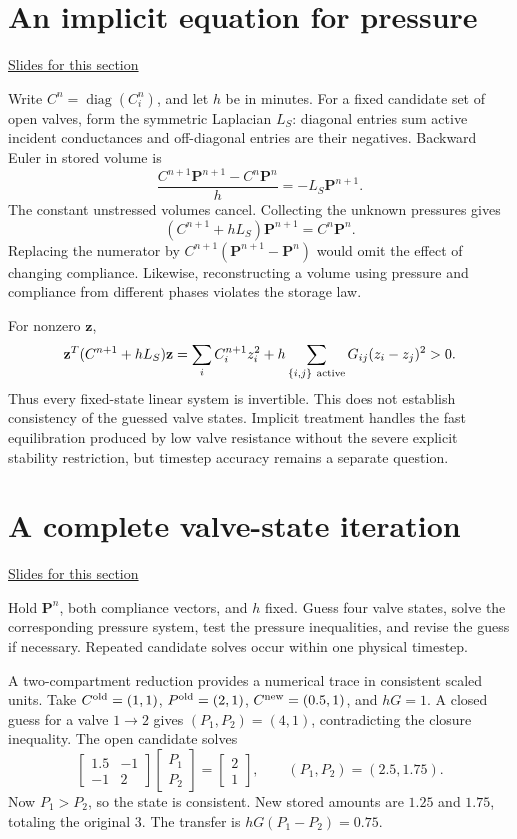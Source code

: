 \documentclass[11pt,letterpaper]{article}
\theoremstyle{definition}\newtheorem{definition}{Definition}\newtheorem{example}{Example}
\numberwithin{equation}{section}
\begin{document}
\section{An implicit equation for pressure}
\hypertarget{note-an-implicit-equation-for-pressure}{}\label{note:an-implicit-equation-for-pressure}
{\small \href{slides.html\#frame=backward-difference-of-stored-volume\&step=1}{Slides for this section}}\par
Write $C^n=\operatorname{diag}(C_i^n)$, and let $h$ be in minutes. For a fixed candidate set of open valves, form the symmetric Laplacian $L_S$: diagonal entries sum active incident conductances and off-diagonal entries are their negatives. Backward Euler in stored volume is
\[
\frac{C^{n+1}\mathbf P^{n+1}-C^n\mathbf P^n}{h}=-L_S\mathbf P^{n+1}.
\]
The constant unstressed volumes cancel. Collecting the unknown pressures gives
\[
\boxed{(C^{n+1}+hL_S)\mathbf P^{n+1}=C^n\mathbf P^n.}
\]
Replacing the numerator by $C^{n+1}(\mathbf P^{n+1}-\mathbf P^n)$ would omit the effect of changing compliance. Likewise, reconstructing a volume using pressure and compliance from different phases violates the storage law.

For nonzero $\mathbf z$,
\[
\mathbf z^T(C^{n+1}+hL_S)\mathbf z=\sum_i C_i^{n+1}z_i^2+h\sum_{\{i,j\}\ {\rm active}}G_{ij}(z_i-z_j)^2>0.
\]
Thus every fixed-state linear system is invertible. This does not establish consistency of the guessed valve states. Implicit treatment handles the fast equilibration produced by low valve resistance without the severe explicit stability restriction, but timestep accuracy remains a separate question.
\section{A complete valve-state iteration}
\hypertarget{note-a-complete-valve-state-iteration}{}\label{note:a-complete-valve-state-iteration}
{\small \href{slides.html\#frame=nested-time-and-valve-iterations\&step=1}{Slides for this section}}\par
Hold $\mathbf P^n$, both compliance vectors, and $h$ fixed. Guess four valve states, solve the corresponding pressure system, test the pressure inequalities, and revise the guess if necessary. Repeated candidate solves occur within one physical timestep.

A two-compartment reduction provides a numerical trace in consistent scaled units. Take $C^{\rm old}=(1,1)$, $P^{\rm old}=(2,1)$, $C^{\rm new}=(0.5,1)$, and $hG=1$. A closed guess for a valve $1\to2$ gives $(P_1,P_2)=(4,1)$, contradicting the closure inequality. The open candidate solves
\[
\begin{bmatrix}1.5&-1\\-1&2\end{bmatrix}
\begin{bmatrix}P_1\\P_2\end{bmatrix}=
\begin{bmatrix}2\\1\end{bmatrix},
\qquad (P_1,P_2)=(2.5,1.75).
\]
Now $P_1>P_2$, so the state is consistent. New stored amounts are $1.25$ and $1.75$, totaling the original $3$. The transfer is $hG(P_1-P_2)=0.75$.
\end{document}
